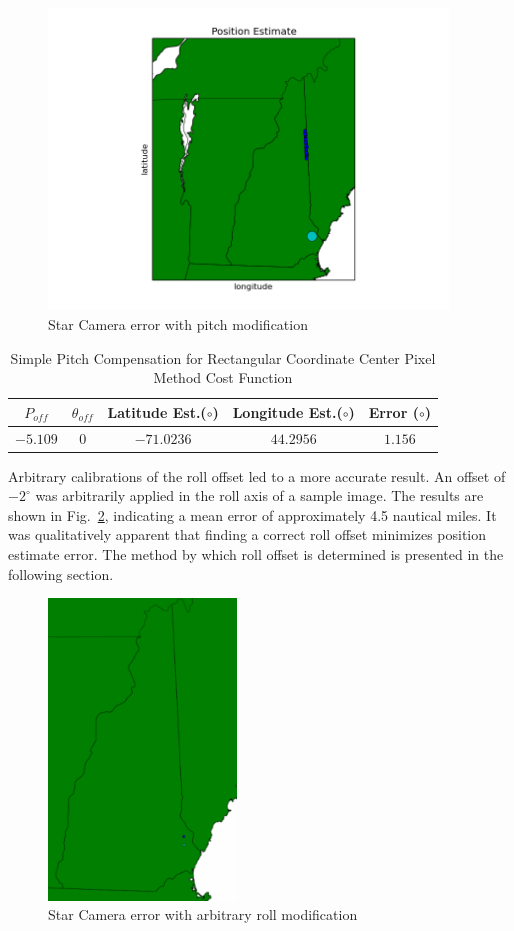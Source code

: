 \documentclass[12pt,a4paper]{book}
\begin{document}
\FloatBarrier
\begin{figure}[!ht]
\centering
\includegraphics[height=8cm]{pitched_map.png}
\caption{Star Camera error with pitch modification}
\label{f:pitched_map}
\end{figure}

\begin{table}[ht!]
\centering
\begin{tabular}{ |c|c|c|c|c| } 
 \hline
 $P_{off}$ & $\theta_{off}$ & Latitude Est.($\circ$) & Longitude Est.($\circ$)&Error ($\circ$) \\ 
 \hline
 $-5.109$ & $0$ & $-71.0236$ & $44.2956$ &$1.156$   \\ 
 \hline
\end{tabular}
\caption{Simple Pitch Compensation for Rectangular Coordinate Center Pixel Method Cost Function}
\label{t:pitched}
\end{table}
\FloatBarrier

Arbitrary calibrations of the roll offset led to a more accurate result.  An offset of $-2^{\circ}$ was arbitrarily applied in the roll axis of a sample image.  The results are shown in Fig.~\ref{f:rollmod}, indicating a mean error of approximately 4.5 nautical miles.  It was qualitatively apparent that finding a correct roll offset minimizes position estimate error.  The method by which roll offset is determined is presented in the following section.  
\begin{figure}[!ht]
\centering
\includegraphics[height=8cm]{rollmod.png}
\caption{Star Camera error with arbitrary roll modification}
\label{f:rollmod}
\end{figure}
\FloatBarrier
\end{document}
